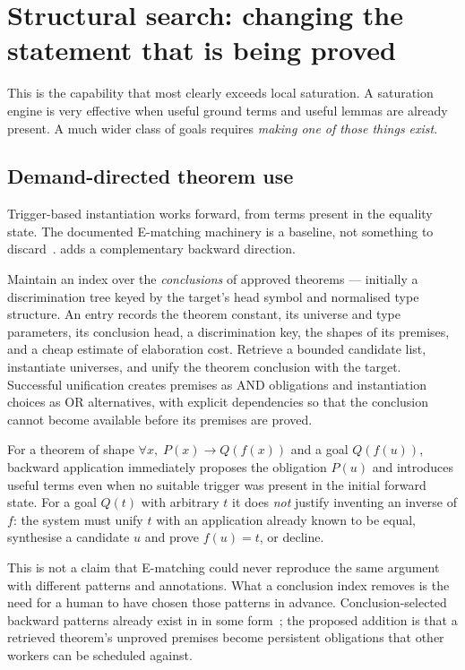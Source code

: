 \section{Structural search: changing the statement that is being proved}
\label{sec:structural}

This is the capability that most clearly exceeds local saturation. A saturation
engine is very effective when useful ground terms and useful lemmas are already
present. A much wider class of goals requires \emph{making one of those things
exist}.

\subsection{Demand-directed theorem use}

Trigger-based instantiation works forward, from terms present in the equality
state. The documented E-matching machinery is a baseline, not something to
discard~\cite{grind-ematch}. \forge{} adds a complementary backward direction.

Maintain an index over the \emph{conclusions} of approved theorems --- initially
a discrimination tree keyed by the target's head symbol and normalised type
structure. An entry records the theorem constant, its universe and type
parameters, its conclusion head, a discrimination key, the shapes of its
premises, and a cheap estimate of elaboration cost. Retrieve a bounded candidate
list, instantiate universes, and unify the theorem conclusion with the target.
Successful unification creates premises as AND obligations and instantiation
choices as OR alternatives, with explicit dependencies so that the conclusion
cannot become available before its premises are proved.

For a theorem of shape $\forall x,\;P(x)\to Q(f(x))$ and a goal $Q(f(u))$,
backward application immediately proposes the obligation $P(u)$ and introduces
useful terms even when no suitable trigger was present in the initial forward
state. For a goal $Q(t)$ with arbitrary $t$ it does \emph{not} justify inventing
an inverse of $f$: the system must unify $t$ with an application already known
to be equal, synthesise a candidate $u$ and prove $f(u)=t$, or decline.

\begin{remark}
This is not a claim that E-matching could never reproduce the same argument with
different patterns and annotations. What a conclusion index removes is the need
for a human to have chosen those patterns in advance. Conclusion-selected
backward patterns already exist in \grind{} in some form~\cite{grind-paper}; the
proposed addition is that a retrieved theorem's unproved premises become
persistent obligations that other workers can be scheduled against.
\end{remark}

